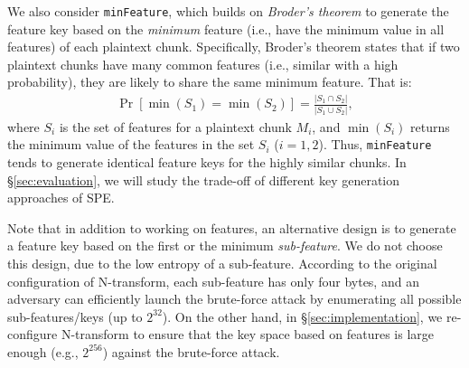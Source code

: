 We also consider {\tt minFeature}, which builds on {\em Broder's theorem} \cite{broder97} to generate the feature key based on the {\em minimum} feature (i.e., have the minimum value in all features) of each plaintext chunk. Specifically, Broder's theorem states that if two plaintext chunks have many common features (i.e., similar with a high probability), they are likely to share the same minimum feature. That is:
\begin{eqnarray}
  \label{eq:broder}
 \Pr[\min(S_1) = \min(S_2)] = \frac{|S_1 \cap S_2|}{|S_1 \cup S_2|},
\end{eqnarray}
where $S_i$ is the set of features for a plaintext chunk $M_i$, and $\min(S_i)$ returns the minimum value of the features in the set $S_i$ ($i = 1, 2$). Thus, {\tt minFeature} tends to generate identical feature keys for the highly similar chunks. In \S\ref{sec:evaluation}, we will study the trade-off of different key generation approaches of SPE.

Note that in addition to working on features, an alternative design is to generate a feature key based on the first or the minimum {\em sub-feature}. We do not choose this design, due to the low entropy of a sub-feature. According to the original configuration \cite{shilane12} of N-transform, each sub-feature has only four bytes, and an adversary can efficiently launch the brute-force attack by  enumerating all possible sub-features/keys (up to $2^{32}$). On the other hand, in \S\ref{sec:implementation}, we re-configure N-transform to ensure that the key space based on features is large enough (e.g., $2^{256}$) against the brute-force attack.


